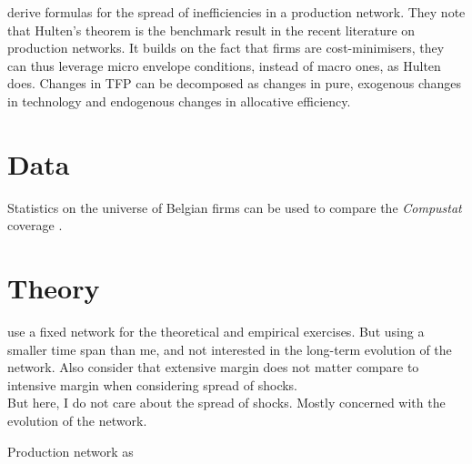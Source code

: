 \documentclass{amsart}
\theoremstyle{definition}
\theoremstyle{remark}
\numberwithin{equation}{section}
\begin{document}
\cite{baqaee2017productivity} derive formulas for the spread of inefficiencies in a production network. They note that Hulten's theorem \citep{hulten1978growth} is the benchmark result in the recent literature on production networks. It builds on the fact that firms are cost-minimisers, they can thus leverage micro envelope conditions, instead of macro ones, as Hulten does. Changes in TFP can be decomposed as changes in pure, exogenous changes in technology and endogenous changes in allocative efficiency.

\section{Data}

Statistics on the universe of Belgian firms can be used to compare the \textit{Compustat} coverage \citep{magerman2016heterogeneous}.

\section{Theory}

\cite{magerman2016heterogeneous} use a fixed network for the theoretical and empirical exercises. But using a smaller time span than me, and not interested in the long-term evolution of the network. Also consider that extensive margin does not matter compare to intensive margin when considering spread of shocks. \\

But here, I do not care about the spread of shocks. Mostly concerned with the evolution of the network.

Production network as 

\newpage



\end{document}
